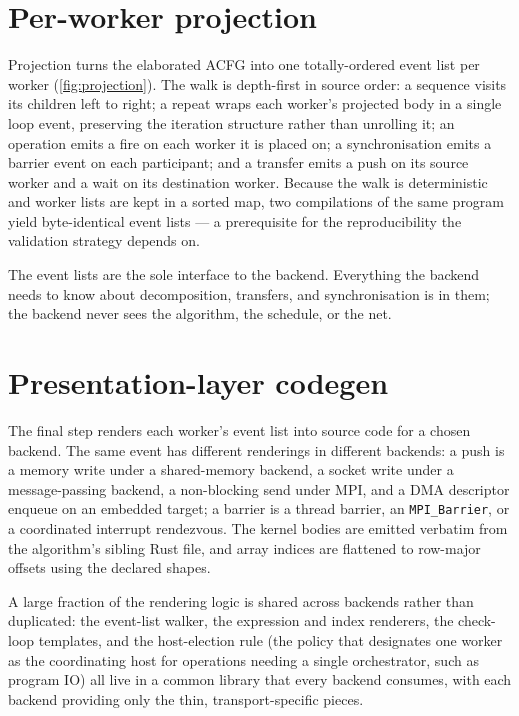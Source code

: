 

\section{Per-worker projection}\label{sec:arch-projection}

Projection turns the elaborated ACFG into one totally-ordered event list per
worker (\cref{fig:projection}). The walk is depth-first in source order: a
sequence visits its children left to right; a repeat wraps each worker's projected
body in a single loop event, preserving the iteration structure rather than
unrolling it; an operation emits a fire on each worker it is placed on; a
synchronisation emits a barrier event on each participant; and a transfer emits a
push on its source worker and a wait on its destination worker. Because the walk
is deterministic and worker lists are kept in a sorted map, two compilations of
the same program yield byte-identical event lists --- a prerequisite for the
reproducibility the validation strategy depends on.



The event lists are the sole interface to the backend. Everything the backend
needs to know about decomposition, transfers, and synchronisation is in them; the
backend never sees the algorithm, the schedule, or the net.

\section{Presentation-layer codegen}\label{sec:arch-codegen}

The final step renders each worker's event list into source code for a chosen
backend. The same event has different renderings in different backends: a push is
a memory write under a shared-memory backend, a socket write under a
message-passing backend, a non-blocking send under MPI, and a DMA descriptor
enqueue on an embedded target; a barrier is a thread barrier, an
\texttt{MPI\_Barrier}, or a coordinated interrupt rendezvous. The kernel bodies
are emitted verbatim from the algorithm's sibling Rust file, and array indices are
flattened to row-major offsets using the declared shapes.

A large fraction of the rendering logic is shared across backends rather than
duplicated: the event-list walker, the expression and index renderers, the
check-loop templates, and the host-election rule (the policy that designates one
worker as the coordinating host for operations needing a single orchestrator, such
as program IO) all live in a common library that every backend consumes, with each
backend providing only the thin, transport-specific pieces.

